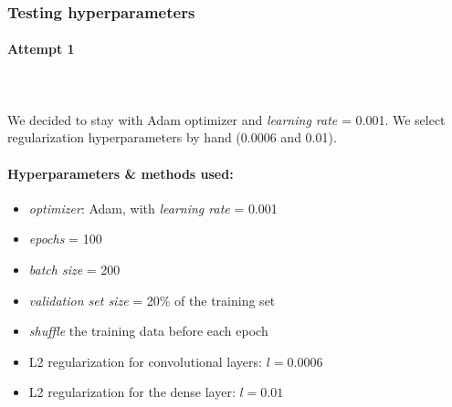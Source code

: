 \documentclass[12pt]{article}
\begin{document}
      \subsubsection{Testing hyperparameters}
        \paragraph{Attempt 1} \mbox{} \\\\
        We decided to stay with Adam optimizer and \textit{learning rate} = 0.001.
        We select regularization hyperparameters by hand (0.0006 and 0.01).
        \paragraph{Hyperparameters \& methods used:}
        \begin{itemize}
          \item \textit{optimizer}: Adam, with \textit{learning rate} = 0.001
          \item \textit{epochs} = 100
          \item \textit{batch size} = 200
          \item \textit{validation set size} = 20\% of the training set
          \item \textit{shuffle} the training data before each epoch
          \item L2 regularization for convolutional layers: $l = 0.0006$
          \item L2 regularization for the dense layer: $l = 0.01$
        \end{itemize}
\end{document}
